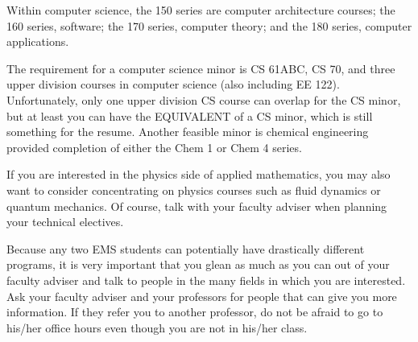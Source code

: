 Within computer science, the 150 series are computer architecture courses; the 160 series, software; the 170 series, computer theory; and the 180 series, computer applications. 

The requirement for a computer science minor is CS 61ABC, CS 70, and three upper division courses in computer science (also including EE 122). Unfortunately, only one upper division CS course can overlap for the CS minor, but at least you can have the EQUIVALENT of a CS minor, which is still something for the resume. Another feasible minor is chemical engineering provided completion of either the Chem 1 or Chem 4 series.

If you are interested in the physics side of applied mathematics, you may also want to consider concentrating on physics courses such as fluid dynamics or quantum mechanics. Of course, talk with your faculty adviser when planning your technical electives.

Because any two EMS students can potentially have drastically different programs, it is very important that you glean as much as you can out of your faculty adviser and talk to people in the many fields in which you are interested. Ask your faculty adviser and your professors for people that can give you more information. If they refer you to another professor, do not be afraid to go to his/her office hours even though you are not in his/her class.

